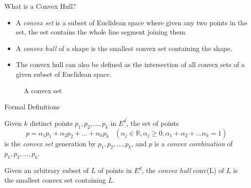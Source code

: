 \documentclass{beamer}
\begin{document}
\begin{frame}{What is a Convex Hull?}
    \begin{itemize}
        \item A \emph{convex set} is a subset of Euclidean space where given any two points in the set,  the set contains the whole line segment joining them.
        \item A  \emph{convex hull} of a shape is the smallest convex set containing the shape. 
        \item The convex hull can also be defined as the intersection of all convex
        sets of a given subset of Euclidean space. 
    \end{itemize}
    \begin{figure}
        \centering
        \caption{A convex set}
        \label{convex}
    \end{figure}
\end{frame}

\begin{frame}[t]{Formal Definitions}
    \begin{definition}
        Given $k$ distinct points $p_1, p_2, \dots, p_k$ in $E^d$, the set of points
        \[p = \alpha_1 p_1 + \alpha_2 p_2 + \dots + \alpha_k p_k
        \; \; \; (\alpha_j \in \mathbb{R}, \alpha_j \geq 0, \alpha_1 + \alpha_2 + \dots \alpha_k = 1)\]
        is the \textit{convex set} generation by $p_1, p_2, \dots, p_k$, and $p$ is a \textit{convex combination} of $p_1, p_2, \dots, p_k$.   
    \end{definition}
    \begin{definition}
        Given an arbitrary subset of $L$ of points in $E^d$, the \emph{convex hull} conv(L) of $L$ is the smallest convex set containing $L$. 
    \end{definition}
\end{frame}
\end{document}
